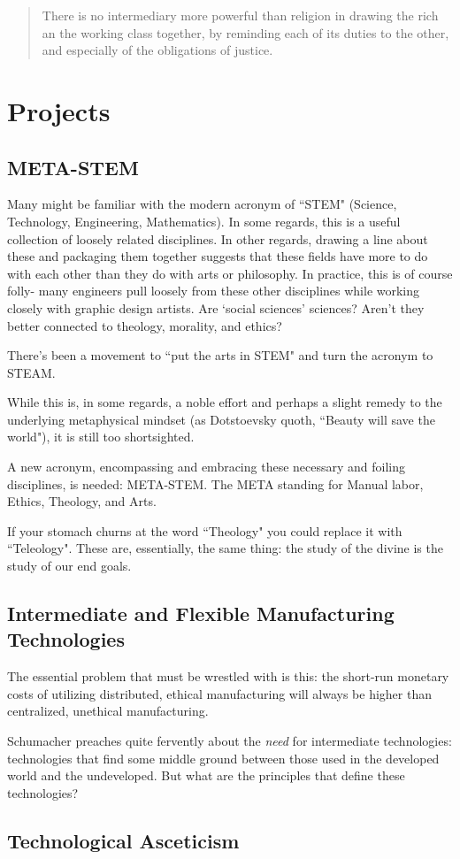 \documentclass[letterpaper]{article}
\begin{document}
\begin{quote}
  There is no intermediary more powerful than religion in drawing the rich an the working class together, by reminding each of its duties to the other, and especially of the obligations of justice.
\end{quote}

\section{Projects}

\subsection{META-STEM}

Many might be familiar with the modern acronym of ``STEM" (Science, Technology, Engineering, Mathematics). In some regards, this is a useful collection of loosely related disciplines. In other regards, drawing a line about these and packaging them together suggests that these fields have more to do with each other than they do with arts or philosophy. In practice, this is of course folly- many engineers pull loosely from these other disciplines while working closely with graphic design artists. Are `social sciences' sciences? Aren't they better connected to theology, morality, and ethics?

There's been a movement to ``put the arts in STEM" and turn the acronym to STEAM.

While this is, in some regards, a noble effort and perhaps a slight remedy to the underlying metaphysical mindset (as Dotstoevsky quoth, ``Beauty will save the world"), it is still too shortsighted.

A new acronym, encompassing and embracing these necessary and foiling disciplines, is needed: META-STEM. The META standing for Manual labor, Ethics, Theology, and Arts.

If your stomach churns at the word ``Theology" you could replace it with ``Teleology". These are, essentially, the same thing: the study of the divine is the study of our end goals.

\subsection{Intermediate and Flexible Manufacturing Technologies}

The essential problem that must be wrestled with is this: the short-run monetary costs of utilizing distributed, ethical manufacturing will always be higher than centralized, unethical manufacturing.

Schumacher preaches quite fervently about the \textit{need} for intermediate technologies: technologies that find some middle ground between those used in the developed world and the undeveloped. But what are the principles that define these technologies?

\subsection{Technological Asceticism}
\end{document}
